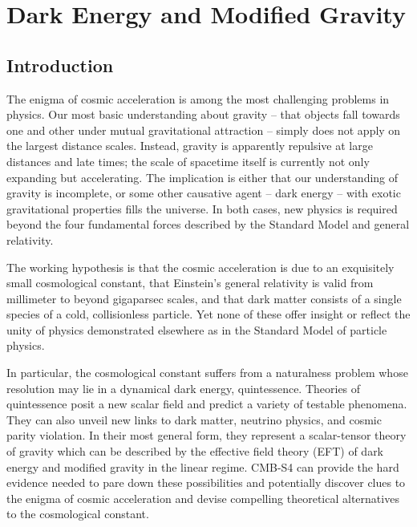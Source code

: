  
\chapter{Dark Energy and Modified Gravity}
\renewcommand*\thesection{\arabic{section}}

\def\gtrsim{\raise-.75ex\hbox{$\buildrel>\over\sim$}}

\section{Introduction}

The enigma of cosmic acceleration is among the most challenging problems in physics. Our most basic understanding about gravity -- that objects fall towards one and other under mutual gravitational attraction -- simply does not apply on the largest distance scales. Instead, gravity is apparently repulsive at large distances and late times; the scale of spacetime itself is currently not only expanding but accelerating. The implication is either that our understanding of gravity is incomplete, or some other causative agent -- dark energy -- with exotic gravitational properties fills the universe. In both cases, new physics is required beyond the four fundamental forces described by the Standard Model and general relativity.

The working hypothesis is that the cosmic acceleration is due to an exquisitely small cosmological constant, that Einstein's general relativity is valid from millimeter to beyond gigaparsec scales, and that dark matter consists of a single species of a cold, collisionless particle. Yet none of these offer insight or reflect the unity of physics demonstrated elsewhere as in the Standard Model of particle physics.

In particular, the cosmological constant suffers from a naturalness problem whose resolution may lie in a dynamical dark energy, quintessence. Theories of quintessence posit a new scalar field and predict a variety of testable phenomena.  They can also unveil new links to dark matter, neutrino physics, and cosmic parity violation. In their most general form, they represent
a scalar-tensor theory of gravity which can be described by  the effective field theory (EFT) of dark energy and modified gravity in the linear regime. 
CMB-S4 can provide the hard evidence  needed to pare down these possibilities and potentially discover clues to the enigma of cosmic acceleration and devise compelling theoretical 
alternatives to the cosmological constant.


